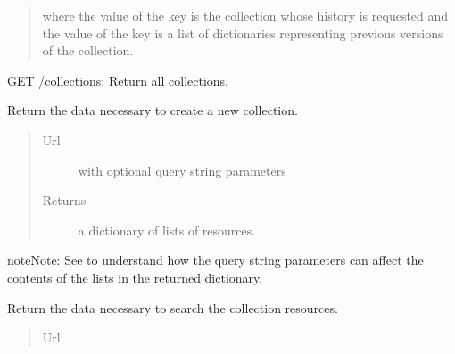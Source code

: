 \documentclass[letterpaper,10pt,english]{sphinxmanual}
\begin{document}
\begin{fulllineitems}
\begin{fulllineitems}
\begin{quote}
\begin{description}
where the value of the  key is the collection whose
history is requested and the value of the  key
is a list of dictionaries representing previous versions of the
collection.


\end{description}\end{quote}

\end{fulllineitems}


\begin{fulllineitems}
\label{api:onlinelinguisticdatabase.controllers.oldcollections.OldcollectionsController.index}
GET /collections: Return all collections.

\end{fulllineitems}


\begin{fulllineitems}
\label{api:onlinelinguisticdatabase.controllers.oldcollections.OldcollectionsController.new}
Return the data necessary to create a new collection.
\begin{quote}\begin{description}
\item[{Url }] \leavevmode
{} with optional query string parameters

\item[{Returns}] \leavevmode
a dictionary of lists of resources.

\end{description}\end{quote}

\begin{notice}{note}{Note:}
See  to understand how the query
string parameters can affect the contents of the lists in the
returned dictionary.
\end{notice}

\end{fulllineitems}


\begin{fulllineitems}
\label{api:onlinelinguisticdatabase.controllers.oldcollections.OldcollectionsController.new_search}
Return the data necessary to search the collection resources.
\begin{quote}\begin{description}
\item[{Url }] \leavevmode
{}


\end{description}
\end{quote}
\end{fulllineitems}
\end{fulllineitems}
\end{document}
